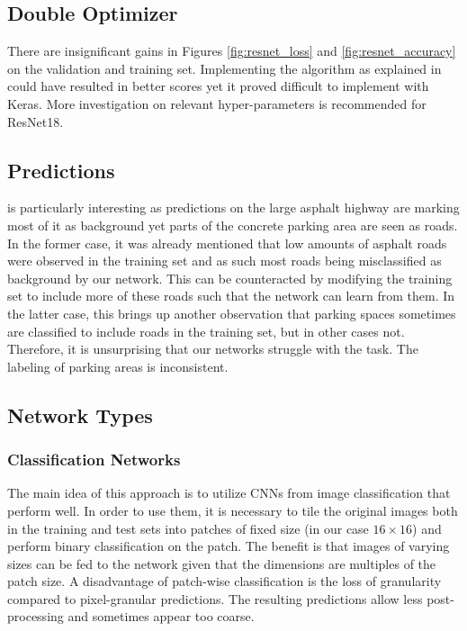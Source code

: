 \documentclass[10pt,conference,compsocconf]{IEEEtran}
\begin{document}
\subsection{Double Optimizer}
There are insignificant gains in Figures \ref{fig:resnet_loss} and \ref{fig:resnet_accuracy} on the validation and training set. Implementing the algorithm as explained in \cite{DBLP:journals/corr/abs-1712-07628} could have resulted in better scores yet it proved difficult to implement with Keras. More investigation on relevant hyper-parameters is recommended for ResNet18.

\subsection{Predictions}
 is particularly interesting as predictions on the large asphalt highway are marking most of it as background yet parts of the concrete parking area are seen as roads. In the former case, it was already mentioned that low amounts of asphalt roads were observed in the training set and as such most roads being misclassified as background by our network. This can be counteracted by modifying the training set to include more of these roads such that the network can learn from them. In the latter case, this brings up another observation that parking spaces sometimes are classified to include roads in the training set, but in other cases not. Therefore, it is unsurprising that our networks struggle with the task. The labeling of parking areas is inconsistent.

\subsection{Network Types}
\subsubsection{Classification Networks}
The main idea of this approach is to utilize CNNs from image classification that perform well. In order to use them, it is necessary to tile the original images both in the training and test sets into patches of fixed size (in our case $16 \times 16$) and perform binary classification on the patch. The benefit is that images of varying sizes can be fed to the network given that the dimensions are multiples of the patch size. A disadvantage of patch-wise classification is the loss of granularity compared to pixel-granular predictions. The resulting predictions allow less post-processing and sometimes appear too coarse.
\end{document}
